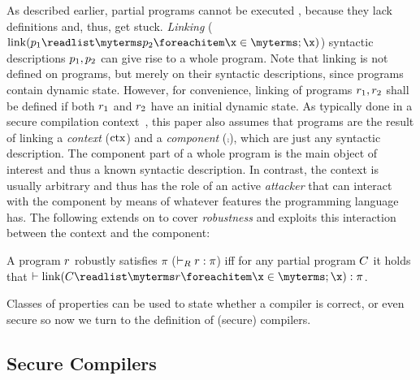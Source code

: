 \documentclass[utf8,acmsmall,review,screen,dvipsnames]{acmart}
\begin{document}
As described earlier, partial programs cannot be executed  , because they lack definitions and, thus, get stuck.
{\em Linking} ($\link{\progvar[_{1}]}{\progvar[_{2}]}$) syntactic descriptions $\progvar[_{1}],\progvar[_{2}]$ can give rise to a whole program.
Note that linking is not defined on programs, but merely on their syntactic descriptions, since programs contain dynamic state.
However, for convenience, linking of programs $\runtimetermvar[_{1}],\runtimetermvar[_{2}]$ shall be defined if both $\runtimetermvar[_{1}]$ and $\runtimetermvar[_{2}]$ have an initial dynamic state.
As typically done in a secure compilation context~\cite{abate2019jour},  this paper also assumes that programs are the result of linking a {\em context} ($\ctx$) and a {\em component} ($\comp$), which are just any syntactic description.
The component part of a whole program is the main object of interest and thus a known syntactic description.
In contrast, the context is usually arbitrary and thus has the role of an active {\em attacker} that can interact with the component by means of whatever features the programming language has.
The following extends on  to cover {\em robustness} and exploits this interaction between the context and the component:

\begin{definition}\label{def:proprsat}
  A program $\runtimetermvar$ robustly satisfies $\pi$ ($\rsat{\runtimetermvar}{\pi}$) iff for any partial program $\contextvar$ it holds that $\sat{\link{\contextvar}{\runtimetermvar}}{\pi}$.
\end{definition}

Classes of properties can be used to state whether a compiler is correct, or even secure so now we turn to the definition of (secure) compilers.

\subsection{Secure Compilers}\label{subsec:bg:rtp}
\end{document}
